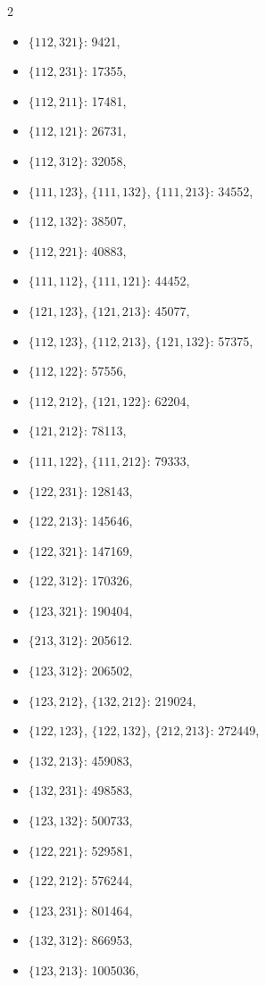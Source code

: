 \documentclass[11pt]{amsart}
\theoremstyle{plain}
\theoremstyle{definition}
\begin{document}
\begin{multicols}{2}
\begin{itemize}
\item $\{112,321\}$:	9421,
\item $\{112,231\}$:	17355,
\item $\{112,211\}$:	17481,
\item $\{112,121\}$:	26731,
\item $\{112,312\}$:	32058,
\item[$\blacksquare$] $\{111,123\}$, $\{111,132\}$, $\{111,213\}$:	34552,
\item $\{112,132\}$:	38507,
\item $\{112,221\}$:	40883,
\item[$\blacksquare$] $\{111,112\}$, $\{111,121\}$:	44452,
\item[$\blacksquare$] $\{121,123\}$, $\{121,213\}$:	45077,
\item[$\blacksquare$] $\{112,123\}$, $\{112,213\}$, $\{121,132\}$:	57375,
\item $\{112,122\}$:	57556,
\item[$\blacksquare$] $\{112,212\}$, $\{121,122\}$:	62204,
\item $\{121,212\}$:	78113,
\item[$\blacksquare$] $\{111,122\}$, $\{111,212\}$:	79333,
\item $\{122,231\}$:	128143,
\item $\{122,213\}$:	145646,
\item $\{122,321\}$:	147169,
\item $\{122,312\}$:	170326,
\item $\{123,321\}$:	190404,
\item $\{213,312\}$:	205612.
\item $\{123,312\}$:	206502,
\item[$\blacksquare$] $\{123,212\}$, $\{132,212\}$:	219024,
\item[$\blacksquare$] $\{122,123\}$, $\{122,132\}$, $\{212,213\}$:	272449,
\item $\{132,213\}$:	459083,
\item $\{132,231\}$:	498583,
\item $\{123,132\}$:	500733,
\item $\{122,221\}$:	529581,
\item $\{122,212\}$:	576244,
\item $\{123,231\}$:	801464,
\item $\{132,312\}$:	866953,
\item $\{123,213\}$:	1005036,
\end{itemize} 	
\end{multicols}
\end{document}
